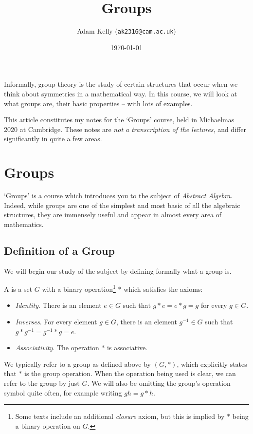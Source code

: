 \documentclass[a4paper]{scrartcl}
\title{Groups}
\author{Adam Kelly (\texttt{ak2316@cam.ac.uk})}
\date{\today}
\newcommand{\newchapter}{\section}
\newcommand{\newsection}{\subsection}
\begin{document}
\maketitle

Informally, group theory is the study of certain structures that occur when we think about symmetries in a mathematical way.  In this course, we will look at what groups are, their basic properties -- with lots of examples.

This article constitutes my notes for the `Groups' course, held in Michaelmas 2020 at Cambridge. These notes are \emph{not a transcription of the lectures}, and differ significantly in quite a few areas.

\tableofcontents



\newchapter{Groups}

`Groups' is a course which introduces you to the subject of \emph{Abstract Algebra}.
Indeed, while groups are one of the simplest and most basic of all the algebraic structures, they are immensely useful and appear in almost every area of mathematics. 

\newsection{Definition of a Group}

We will begin our study of the subject by defining formally what a group is.

\begin{definition}[Group]
	A  is a set $G$ with a binary operation\footnote{Some texts include an additional \emph{closure} axiom, but this is implied by $*$ being a binary operation on $G$.} $*$ which satisfies the axioms:
	\begin{itemize}
		\item \emph{Identity}. There is an element $e \in G$ such that $g * e = e * g = g$ for every $g \in G$.
		\item \emph{Inverses}. For every element $g \in G$, there is an element $g^{-1} \in G$ such that $g * g^{-1} = g^{-1} * g = e$.
		\item \emph{Associativity}. The operation $*$ is associative.
	\end{itemize}
\end{definition}

We typically refer to a group as defined above by $(G, *)$, which explicitly states that $*$ is the group operation. When the operation being used is clear, we can refer to the group by just $G$. We will also be omitting the group's operation symbol quite often, for example writing $gh = g * h$. 
\end{document}
